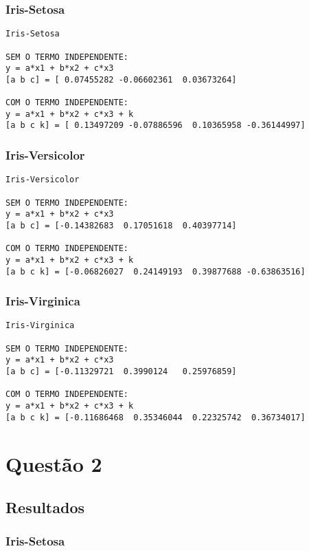 \documentclass[a4paper,12pt,twoside]{article}
\begin{document}
\subsubsection{Iris-Setosa}
\begin{lstlisting}
Iris-Setosa

SEM O TERMO INDEPENDENTE: 
y = a*x1 + b*x2 + c*x3
[a b c] = [ 0.07455282 -0.06602361  0.03673264]

COM O TERMO INDEPENDENTE: 
y = a*x1 + b*x2 + c*x3 + k
[a b c k] = [ 0.13497209 -0.07886596  0.10365958 -0.36144997]
\end{lstlisting}

\subsubsection{Iris-Versicolor}
\begin{lstlisting}
Iris-Versicolor

SEM O TERMO INDEPENDENTE: 
y = a*x1 + b*x2 + c*x3
[a b c] = [-0.14382683  0.17051618  0.40397714]

COM O TERMO INDEPENDENTE: 
y = a*x1 + b*x2 + c*x3 + k
[a b c k] = [-0.06826027  0.24149193  0.39877688 -0.63863516]
\end{lstlisting}

\subsubsection{Iris-Virginica}
\begin{lstlisting}
Iris-Virginica

SEM O TERMO INDEPENDENTE: 
y = a*x1 + b*x2 + c*x3
[a b c] = [-0.11329721  0.3990124   0.25976859]

COM O TERMO INDEPENDENTE: 
y = a*x1 + b*x2 + c*x3 + k
[a b c k] = [-0.11686468  0.35346044  0.22325742  0.36734017]
\end{lstlisting}

\section{Questão 2}
\subsection{Resultados}
\subsubsection {Iris-Setosa}
\end{document}

